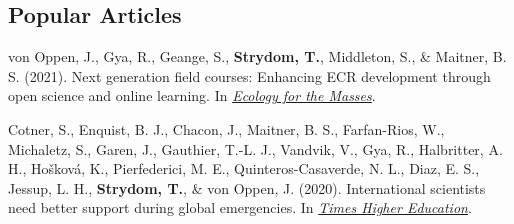 \documentclass[11pt,a4paper,]{awesome-cv}
\newlength{\cslhangindent}
\newenvironment{CSLReferences}[2] %
 {%
  \setlength{\parindent}{0pt}
  \ifodd #1 \everypar{\setlength{\hangindent}{\cslhangindent}}\ignorespaces\fi
  \ifnum #2 > 0
  \setlength{\parskip}{#2\baselineskip}
  \fi
 }%
 {}
\begin{document}
\hypertarget{popular-articles}{%
\subsection{\texorpdfstring{\textbf{Popular
Articles}}{Popular Articles}}\label{popular-articles}}

\hypertarget{refs-popular}{}
\begin{CSLReferences}{1}{0}
\leavevmode{}%
von Oppen, J., Gya, R., Geange, S., \textbf{Strydom, T.}, Middleton, S.,
\& Maitner, B. S. (2021). Next generation field courses: Enhancing ECR
development through open science and online learning. In
\emph{\href{https://ecologyforthemasses.com/2021/03/08/next-generation-field-courses-enhancing-ecr-development-through-open-science-and-online-learning/}{Ecology
for the Masses}}.

\leavevmode{}%
Cotner, S., Enquist, B. J., Chacon, J., Maitner, B. S., Farfan-Rios, W.,
Michaletz, S., Garen, J., Gauthier, T.-L. J., Vandvik, V., Gya, R.,
Halbritter, A. H., Hošková, K., Pierfederici, M. E.,
Quinteros-Casaverde, N. L., Diaz, E. S., Jessup, L. H.,
\textbf{Strydom, T.}, \& von Oppen, J. (2020). International scientists
need better support during global emergencies. In
\emph{\href{https://tinyurl.com/y5ccw9nb}{Times Higher Education}}.

\end{CSLReferences}
\end{document}
